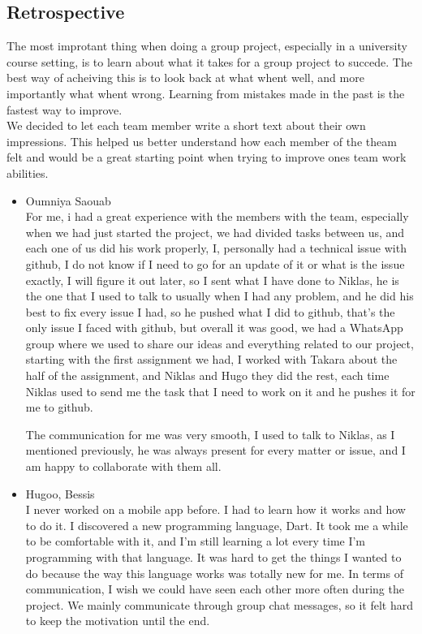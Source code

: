 \documentclass[10pt]{article}
\begin{document}
\begin{multicols*}{2}
\clearpage 

\section{Retrospective}


The most improtant thing when doing a group project, especially in a university course setting, is to learn about what it takes for a group project to succede.
The best way of acheiving this is to look back at what whent well, and more importantly what whent wrong. Learning from mistakes made in the past is the fastest way to improve.\\

We decided to let each team member write a short text about their own impressions. This helped us better understand how each member of the theam felt and would be a great starting point when trying to improve ones team work abilities.

\begin{itemize}
  \item {Oumniya Saouab}\\
  For me, i had a great experience with the members with the team, especially when we had just started the project, we had divided tasks between us, and each one of us did his work properly, I, personally had a technical issue with github, I do not know if I need to go for an update of it or what is the issue exactly, I will figure it out later, so I sent what I have done to Niklas, he is the one that I used to talk to usually when I had any problem, and he did his best to fix every issue I had, so he pushed what I did to github, that’s the only issue I faced with github, but overall it was good, we had a WhatsApp group where we used to share our ideas and everything related to our project, starting with the first assignment we had, I worked with Takara about the half of the assignment, and Niklas and Hugo they did the rest, each time Niklas used to send me the task that I need to work on it and he pushes it for me to github. 
  
  The communication for me was very smooth, I used to talk to Niklas, as I mentioned previously, he was always present for every matter or issue, and I am happy to collaborate with them all. 

  \item {Hugoo, Bessis}\\
  I never worked on a mobile app before. I had to learn how it works and how to do it. I discovered a new programming language, Dart. It took me a while to be comfortable with it, and I'm still learning a lot every time I'm programming with that language. It was hard to get the things I wanted to do because the way this language works was totally new for me.
  In terms of communication, I wish we could have seen each other more often during the project. We mainly communicate through group chat messages, so it felt hard to keep the motivation until the end.
  

\end{itemize}
\end{multicols*}
\end{document}
